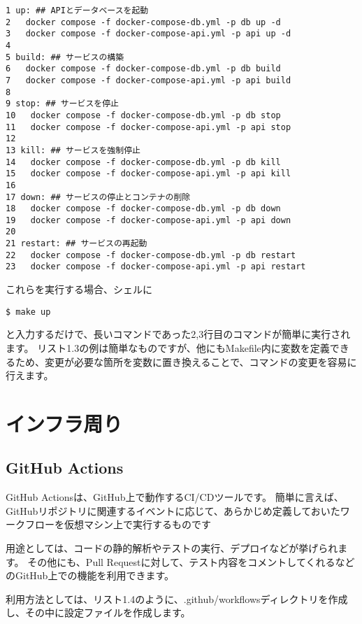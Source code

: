 \begin{tcolorbox}[title=リスト1.3 Makefile]
  \begin{verbatim}
1 up: ## APIとデータベースを起動
2   docker compose -f docker-compose-db.yml -p db up -d
3   docker compose -f docker-compose-api.yml -p api up -d
4 
5 build: ## サービスの構築
6   docker compose -f docker-compose-db.yml -p db build
7   docker compose -f docker-compose-api.yml -p api build
8 
9 stop: ## サービスを停止
10   docker compose -f docker-compose-db.yml -p db stop
11   docker compose -f docker-compose-api.yml -p api stop
12 
13 kill: ## サービスを強制停止
14   docker compose -f docker-compose-db.yml -p db kill
15   docker compose -f docker-compose-api.yml -p api kill
16 
17 down: ## サービスの停止とコンテナの削除
18   docker compose -f docker-compose-db.yml -p db down
19   docker compose -f docker-compose-api.yml -p api down
20 
21 restart: ## サービスの再起動
22   docker compose -f docker-compose-db.yml -p db restart
23   docker compose -f docker-compose-api.yml -p api restart
 \end{verbatim}
\end{tcolorbox}

これらを実行する場合、シェルに
\begin{shaded}
  \begin{verbatim}
$ make up
\end{verbatim}
\end{shaded}
と入力するだけで、長いコマンドであった2,3行目のコマンドが簡単に実行されます。
リスト1.3の例は簡単なものですが、他にもMakefile内に変数を定義できるため、変更が必要な箇所を変数に置き換えることで、コマンドの変更を容易に行えます。

\section{インフラ周り}

\subsection{GitHub Actions}
GitHub Actionsは、GitHub上で動作するCI/CDツールです。
簡単に言えば、GitHubリポジトリに関連するイベントに応じて、あらかじめ定義しておいたワークフローを仮想マシン上で実行するものです

用途としては、コードの静的解析やテストの実行、デプロイなどが挙げられます。
その他にも、Pull Requestに対して、テスト内容をコメントしてくれるなどのGitHub上での機能を利用できます。

利用方法としては、リスト1.4のように、.github/workflowsディレクトリを作成し、その中に設定ファイルを作成します。

